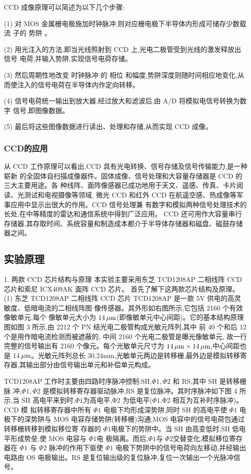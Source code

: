 \documentclass{ctexart}
\begin{document}
CCD 成像原理可以简述为以下几个步骤:

(1) 对 MOS 金属栅电极施加时钟脉冲,则对应栅电极下半导体内形成可储存少数载流
子的 势阱 。

(2) 用光注入的方法,即当光线照射到 CCD 上,光电二极管受到光线的激发释放出信号
电荷,并输入势阱,实现信号电荷存储。

(3) 然后周期性地改变 时钟脉冲 的 相位 和幅度,势阱深度则随时间相应地变化,从而使注入的信号电荷在半导体内作定向转移。

(4) 信号电荷统一输出到放大器,经过放大和滤波后,由 A/D 将模拟电信号转换为数字
信号,即图像数据。

(5) 最后将这些图像数据进行读出、处理和存储,从而实现 CCD 成像。

\subsubsection{CCD的应用}
从 CCD 工作原理可以看出,CCD 具有光电转换、信号存储及信号传输能力,是一种崭新
的全固体自扫描成像器件。固体成像、信号处理和大容量存储器是 CCD 的三大主要用途。各
种线阵、面阵像感器已成功地用于天文、遥感、传真、卡片阅读、光测试和电视摄像等领域,
微光 CCD 和红外 CCD 在航遥空感、热成像等军事应用中显示出很大的作用。CCD 信号处理兼
有数字和模拟两种信号处理技术的长处,在中等精度的雷达和通信系统中得到广泛应用。
CCD 还可用作大容量串行存储器,其存取时间、系统容量和制造成本都介于半导体存储器和磁盘、磁鼓存储器之间。
\subsection{实验原理}
1. 两款 CCD 芯片结构与原理
本实验主要采用东芝 TCD1208AP 二相线阵 CCD 芯片和索尼 ICX409AK 面阵 CCD 芯片。
首先了解下这两款芯片结构及原理。
(1) 东芝 TCD1208AP 二相线阵 CCD 芯片
TCD1208AP 是一款 5V 供电的高灵敏度、低暗电流的二相线阵图
像传感器。其外形如右图所示,它包括 2160 个有效像敏单元,每个
像敏单元大小为 $14\,\mathrm{\mu m}$(即像敏单元中心间距)。它的基本结构原理
图如图 3 所示,由 2212 个 PN 结光电二极管构成光敏元阵列,其中
前 40 个和后 12 个是用作暗电流检测而被遮蔽的,
中间 2160 个光电二极管是曝光像敏单元,
故一行完整的信号输出有 2160 个像元。每个光敏单元尺寸为 $14\,\mathrm{\mu m} \times 14\,\mathrm{\mu m}$,中心间距也是
14$\,\mathrm{\mu m}$。光敏元阵列总长 30.24mm,光敏单元两边是转移栅,最外边是模拟转移寄存器,其输出部分由信号输出单元和补偿单元构成。

TCD1208AP 工作时主要由四路时序脉冲控制:SH,$\Phi1,\Phi 2$ 和 RS,其中 SH 是转移栅脉
冲,$\Phi 1,\Phi 2$ 是模拟转移寄存器驱动脉冲,RS 是复位脉冲。其时序脉冲如下图 4 所示,当
SH 高电平来到时,$\Phi 1$为高电平,Φ2 为低电平($\Phi 1$,Φ2 相互为互补时序脉冲)。CCD 模
拟转移寄存器中所有 $\Phi 1$ 电极下均形成深势阱,同时 SH 的高电平使 $\Phi 1$ 电极下的深势阱与
MOS 电容存储势阱(转移栅)沟通,MOS 电容中的信号电荷包通过转移栅转移到模拟移位寄
存器的 $\Phi 1$电极下的势阱中。当 SH 由高变低时,SH 低电平形成势垒,使 MOS 电容与 $\Phi 1$电
极隔离。而后,$\Phi 1$与 $\Phi 2$交替变化,模拟移位寄存器在 $\Phi 1$ 与 $\Phi 2$ 脉冲的作用下驱使 $\Phi 1$
电极下势阱中的信号电荷向左移动,并经输出电路由 OS 电极输出。RS 是复位输出级的复位脉冲,复位一次输出一个光脉冲信号。
\end{document}
